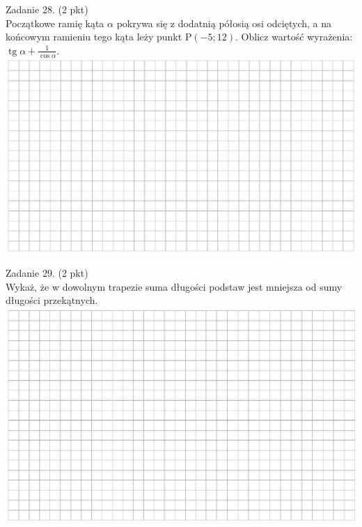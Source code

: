 \documentclass[10pt]{article}
\begin{document}
Zadanie 28. (2 pkt)\\
Początkowe ramię kąta \(\alpha\) pokrywa się z dodatnią półosią osi odciętych, a na końcowym ramieniu tego kąta leży punkt \(\mathrm{P}(-5 ; 12)\). Oblicz wartość wyrażenia: \(\operatorname{tg} \alpha+\frac{1}{\cos \alpha}\).\\
\includegraphics[max width=\textwidth, center]{2024_11_21_23d228cacd5e4a9a3f86g-09}

Zadanie 29. (2 pkt)\\
Wykaż, że w dowolnym trapezie suma długości podstaw jest mniejsza od sumy długości przekątnych.\\
\includegraphics[max width=\textwidth, center]{2024_11_21_23d228cacd5e4a9a3f86g-09(1)}
\end{document}
